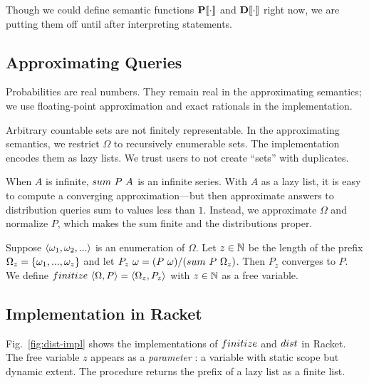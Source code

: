 Though we could define semantic functions $\mathbf{P}\!\left\llbracket{\cdot}\right\rrbracket$ and $\mathbf{D}\!\left\llbracket{\cdot}\right\rrbracket$ right now, we are putting them off until after interpreting statements.

\subsection{Approximating Queries}

Probabilities are real numbers. They remain real in the approximating semantics; we use floating-point approximation and exact rationals in the implementation.

Arbitrary countable sets are not finitely representable. In the approximating semantics, we restrict $\Omega$ to recursively enumerable sets. The implementation encodes them as lazy lists. We trust users to not create ``sets'' with duplicates.

When $A$ is infinite, ${sum}\ {P}\ {A}$ is an infinite series. With $A$ as a lazy list, it is easy to compute a converging approximation---but then approximate answers to distribution queries sum to values less than $1$. Instead, we approximate $\Omega$ and normalize $P$, which makes the sum finite and the distributions proper.

Suppose $\langle{\omega_1,\omega_2,...}\rangle$ is an enumeration of $\Omega$. Let $z \in \mathbb{N}$ be the length of the prefix $\Omega_z = \{{\omega_1,...,\omega_z}\}$ and let ${P_z}\ {\omega} = {\left({P}\ {\omega}\right)} / {\left({sum}\ {P}\ {\Omega_z}\right)}$. Then $P_z$ converges to $P$. We define ${finitize}\ {\langle{\Omega,P}\rangle} = \langle{\Omega_z,P_z}\rangle$ with $z\in\mathbb{N}$ as a free variable.

\subsection{Implementation in Racket}

Fig.~\ref{fig:dist-impl} shows the implementations of $finitize$ and $dist$ in Racket. The free variable $z$ appears as a \textit{parameter} : a variable with static scope but dynamic extent. The  procedure returns the prefix of a lazy list as a finite list.


